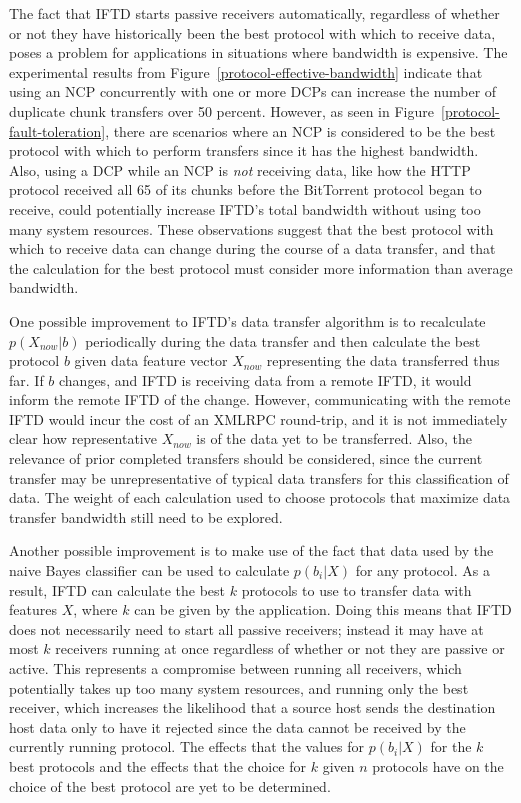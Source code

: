 The fact that IFTD starts passive receivers automatically, regardless of whether or not they have historically been the best protocol with which to receive data, poses a problem for applications in situations where bandwidth is expensive.  The experimental results from Figure~\ref{protocol-effective-bandwidth} indicate that using an NCP concurrently with one or more DCPs can increase the number of duplicate chunk transfers over 50 percent.  However, as seen in Figure~\ref{protocol-fault-toleration}, there are scenarios where an NCP is considered to be the best protocol with which to perform transfers since it has the highest bandwidth.  Also, using a DCP while an NCP is \textit{not} receiving data, like how the HTTP protocol received all 65 of its chunks before the BitTorrent protocol began to receive, could potentially increase IFTD's total bandwidth without using too many system resources.  These observations suggest that the best protocol with which to receive data can change during the course of a data transfer, and that the calculation for the best protocol must consider more information than average bandwidth.

One possible improvement to IFTD's data transfer algorithm is to recalculate $p(X_{now}|b)$ periodically during the data transfer and then calculate the best protocol $b$ given data feature vector $X_{now}$ representing the data transferred thus far.  If $b$ changes, and IFTD is receiving data from a remote IFTD, it would inform the remote IFTD of the change.  However, communicating with the remote IFTD would incur the cost of an XMLRPC round-trip, and it is not immediately clear how representative $X_{now}$ is of the data yet to be transferred.  Also, the relevance of prior completed transfers should be considered, since the current transfer may be unrepresentative of typical data transfers for this classification of data.  The weight of each calculation used to choose protocols that maximize data transfer bandwidth still need to be explored.

Another possible improvement is to make use of the fact that data used by the naive Bayes classifier can be used to calculate $p(b_i|X)$ for any protocol.  As a result, IFTD can calculate the best $k$ protocols to use to transfer data with features $X$, where $k$ can be given by the application.  Doing this means that IFTD does not necessarily need to start all passive receivers; instead it may have at most $k$ receivers running at once regardless of whether or not they are passive or active.  This represents a compromise between running all receivers, which potentially takes up too many system resources, and running only the best receiver, which increases the likelihood that a source host sends the destination host data only to have it rejected since the data cannot be received by the currently running protocol.  The effects that the values for $p(b_i|X)$ for the $k$ best protocols and the effects that the choice for $k$ given $n$ protocols have on the choice of the best protocol are yet to be determined.

